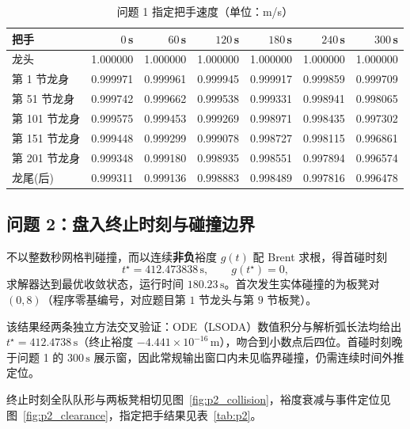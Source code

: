 \documentclass[a4paper, 12pt]{ctexart}
\begin{document}
\begin{table}[H]
  \centering
  \small
  \setlength{\tabcolsep}{6pt}
  \caption{问题 1 指定把手速度（单位：m/s）}
  \label{tab:p1_spd}
  \begin{tabular}{lrrrrrr}
    \toprule
    \textbf{把手} & \textbf{$0\,$s} & \textbf{$60\,$s} & \textbf{$120\,$s} & \textbf{$180\,$s} & \textbf{$240\,$s} & \textbf{$300\,$s} \\
    \midrule
    龙头 & 1.000000 & 1.000000 & 1.000000 & 1.000000 & 1.000000 & 1.000000 \\
    第 1 节龙身 & 0.999971 & 0.999961 & 0.999945 & 0.999917 & 0.999859 & 0.999709 \\
    第 51 节龙身 & 0.999742 & 0.999662 & 0.999538 & 0.999331 & 0.998941 & 0.998065 \\
    第 101 节龙身 & 0.999575 & 0.999453 & 0.999269 & 0.998971 & 0.998435 & 0.997302 \\
    第 151 节龙身 & 0.999448 & 0.999299 & 0.999078 & 0.998727 & 0.998115 & 0.996861 \\
    第 201 节龙身 & 0.999348 & 0.999180 & 0.998935 & 0.998551 & 0.997894 & 0.996574 \\
    龙尾(后) & 0.999311 & 0.999136 & 0.998883 & 0.998489 & 0.997816 & 0.996478 \\
    \bottomrule
  \end{tabular}
\end{table}

\subsection{问题 2：盘入终止时刻与碰撞边界}

不以整数秒网格判碰撞，而以连续\textbf{非负}裕度 $g(t)$ 配 Brent 求根，得首碰时刻
\begin{equation}
t^\star = 412.473838\,\mathrm{s},\qquad g(t^\star)=0,
\end{equation}
求解器达到最优收敛状态，运行时间 $180.23\,\mathrm{s}$。首次发生实体碰撞的为板凳对 $(0,8)$（程序零基编号，对应题目第 $1$ 节龙头与第 $9$ 节板凳）。

该结果经两条独立方法交叉验证：ODE（LSODA）数值积分与解析弧长法均给出 $t^\star=412.4738\,\mathrm{s}$（终止裕度 $-4.441\times10^{-16}\,\mathrm{m}$），吻合到小数点后四位。首碰时刻晚于问题 1 的 $300\,\mathrm{s}$ 展示窗，因此常规输出窗口内未见临界碰撞，仍需连续时间外推定位。

终止时刻全队队形与两板凳相切见图~\ref{fig:p2_collision}，裕度衰减与事件定位见图~\ref{fig:p2_clearance}，指定把手结果见表~\ref{tab:p2}。
\end{document}
